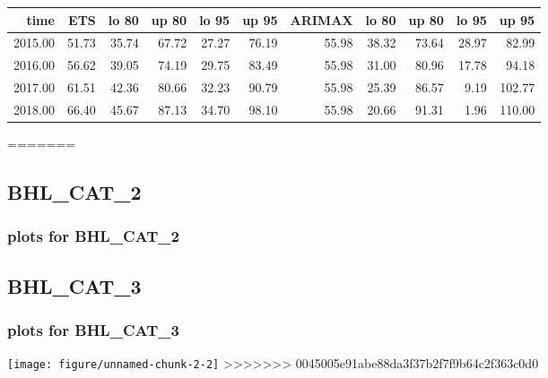 \documentclass[10pt,a4paper]{article}\usepackage[]{graphicx}\usepackage[]{color}
\makeatletter
\def\maxwidth{ %
  \ifdim\Gin@nat@width>\linewidth
    \linewidth
  \else
    \Gin@nat@width
  \fi
}
\newenvironment{kframe}{%
 \def\at@end@of@kframe{}%
 \ifinner\ifhmode%
  \def\at@end@of@kframe{\end{minipage}}%
  \begin{minipage}{\columnwidth}%
 \fi\fi%
 \def\FrameCommand##1{\hskip\@totalleftmargin \hskip-\fboxsep
 \colorbox{shadecolor}{##1}\hskip-\fboxsep
     \hskip-\linewidth \hskip-\@totalleftmargin \hskip\columnwidth}%
 \MakeFramed {\advance\hsize-\width
   \@totalleftmargin\z@ \linewidth\hsize
   \@setminipage}}%
 {\par\unskip\endMakeFramed%
 \at@end@of@kframe}
\newcommand{\AaA}{\_}
\makeatother
\begin{document}
\begin{table}[ht]
\centering
\begin{tabular}{rrrrrrrrrrr}
  \hline
time & ETS  & lo 80 & up 80 & lo 95 & up 95 & ARIMAX  & lo 80 & up 80 & lo 95 & up 95 \\ 
  \hline
2015.00 & 51.73 & 35.74 & 67.72 & 27.27 & 76.19 & 55.98 & 38.32 & 73.64 & 28.97 & 82.99 \\ 
  2016.00 & 56.62 & 39.05 & 74.19 & 29.75 & 83.49 & 55.98 & 31.00 & 80.96 & 17.78 & 94.18 \\ 
  2017.00 & 61.51 & 42.36 & 80.66 & 32.23 & 90.79 & 55.98 & 25.39 & 86.57 & 9.19 & 102.77 \\ 
  2018.00 & 66.40 & 45.67 & 87.13 & 34.70 & 98.10 & 55.98 & 20.66 & 91.31 & 1.96 & 110.00 \\ 
   \hline
\end{tabular}
\end{table}

\newpage
=======
\subsection{BHL\AaA CAT\AaA 2}
\subsubsection{plots for BHL\AaA CAT\AaA 2}

\newpage
\subsection{BHL\AaA CAT\AaA 3}
\subsubsection{plots for BHL\AaA CAT\AaA 3}
\begin{kframe}

{\ttfamily\noindent\bfseries\color{errorcolor}{\#\# Error in ets(My\_S\_OOSample, model = fit): You've got to be joking. I need more data!}}\end{kframe}
\texttt{[image: figure/unnamed-chunk-2-2]} 
>>>>>>> 0045005e91abe88da3f37b2f7f9b64c2f363c0d0
\end{document}
